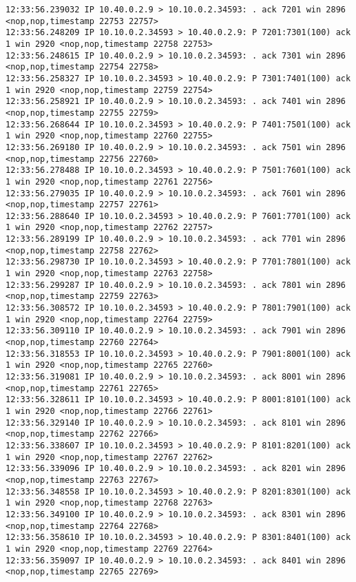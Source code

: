 \documentclass[a4paper,12pt]{article}
\begin{document}
\begin{lstlisting}
12:33:56.239032 IP 10.40.0.2.9 > 10.10.0.2.34593: . ack 7201 win 2896 <nop,nop,timestamp 22753 22757>
12:33:56.248209 IP 10.10.0.2.34593 > 10.40.0.2.9: P 7201:7301(100) ack 1 win 2920 <nop,nop,timestamp 22758 22753>
12:33:56.248615 IP 10.40.0.2.9 > 10.10.0.2.34593: . ack 7301 win 2896 <nop,nop,timestamp 22754 22758>
12:33:56.258327 IP 10.10.0.2.34593 > 10.40.0.2.9: P 7301:7401(100) ack 1 win 2920 <nop,nop,timestamp 22759 22754>
12:33:56.258921 IP 10.40.0.2.9 > 10.10.0.2.34593: . ack 7401 win 2896 <nop,nop,timestamp 22755 22759>
12:33:56.268644 IP 10.10.0.2.34593 > 10.40.0.2.9: P 7401:7501(100) ack 1 win 2920 <nop,nop,timestamp 22760 22755>
12:33:56.269180 IP 10.40.0.2.9 > 10.10.0.2.34593: . ack 7501 win 2896 <nop,nop,timestamp 22756 22760>
12:33:56.278488 IP 10.10.0.2.34593 > 10.40.0.2.9: P 7501:7601(100) ack 1 win 2920 <nop,nop,timestamp 22761 22756>
12:33:56.279035 IP 10.40.0.2.9 > 10.10.0.2.34593: . ack 7601 win 2896 <nop,nop,timestamp 22757 22761>
12:33:56.288640 IP 10.10.0.2.34593 > 10.40.0.2.9: P 7601:7701(100) ack 1 win 2920 <nop,nop,timestamp 22762 22757>
12:33:56.289199 IP 10.40.0.2.9 > 10.10.0.2.34593: . ack 7701 win 2896 <nop,nop,timestamp 22758 22762>
12:33:56.298730 IP 10.10.0.2.34593 > 10.40.0.2.9: P 7701:7801(100) ack 1 win 2920 <nop,nop,timestamp 22763 22758>
12:33:56.299287 IP 10.40.0.2.9 > 10.10.0.2.34593: . ack 7801 win 2896 <nop,nop,timestamp 22759 22763>
12:33:56.308572 IP 10.10.0.2.34593 > 10.40.0.2.9: P 7801:7901(100) ack 1 win 2920 <nop,nop,timestamp 22764 22759>
12:33:56.309110 IP 10.40.0.2.9 > 10.10.0.2.34593: . ack 7901 win 2896 <nop,nop,timestamp 22760 22764>
12:33:56.318553 IP 10.10.0.2.34593 > 10.40.0.2.9: P 7901:8001(100) ack 1 win 2920 <nop,nop,timestamp 22765 22760>
12:33:56.319081 IP 10.40.0.2.9 > 10.10.0.2.34593: . ack 8001 win 2896 <nop,nop,timestamp 22761 22765>
12:33:56.328611 IP 10.10.0.2.34593 > 10.40.0.2.9: P 8001:8101(100) ack 1 win 2920 <nop,nop,timestamp 22766 22761>
12:33:56.329140 IP 10.40.0.2.9 > 10.10.0.2.34593: . ack 8101 win 2896 <nop,nop,timestamp 22762 22766>
12:33:56.338607 IP 10.10.0.2.34593 > 10.40.0.2.9: P 8101:8201(100) ack 1 win 2920 <nop,nop,timestamp 22767 22762>
12:33:56.339096 IP 10.40.0.2.9 > 10.10.0.2.34593: . ack 8201 win 2896 <nop,nop,timestamp 22763 22767>
12:33:56.348558 IP 10.10.0.2.34593 > 10.40.0.2.9: P 8201:8301(100) ack 1 win 2920 <nop,nop,timestamp 22768 22763>
12:33:56.349100 IP 10.40.0.2.9 > 10.10.0.2.34593: . ack 8301 win 2896 <nop,nop,timestamp 22764 22768>
12:33:56.358610 IP 10.10.0.2.34593 > 10.40.0.2.9: P 8301:8401(100) ack 1 win 2920 <nop,nop,timestamp 22769 22764>
12:33:56.359097 IP 10.40.0.2.9 > 10.10.0.2.34593: . ack 8401 win 2896 <nop,nop,timestamp 22765 22769>

\end{lstlisting}
\end{document}
